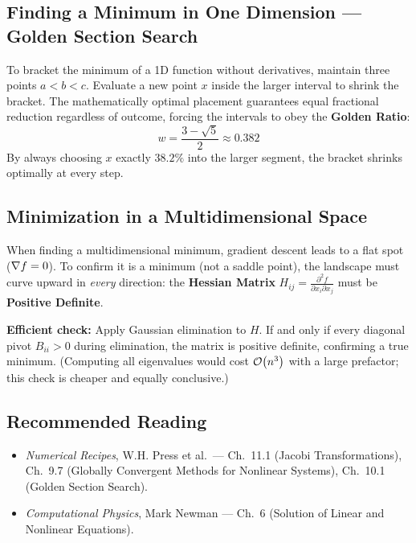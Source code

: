 \subsection{Finding a Minimum in One Dimension --- Golden Section Search}
To bracket the minimum of a 1D function without derivatives, maintain three
points $a < b < c$. Evaluate a new point $x$ inside the larger interval to
shrink the bracket. The mathematically optimal placement guarantees equal
fractional reduction regardless of outcome, forcing the intervals to obey
the \textbf{Golden Ratio}:
\begin{equation}
w = \frac{3 - \sqrt{5}}{2} \approx 0.382
\end{equation}
By always choosing $x$ exactly $38.2\%$ into the larger segment, the bracket
shrinks optimally at every step.

\subsection{Minimization in a Multidimensional Space}
When finding a multidimensional minimum, gradient descent leads to a flat
spot ($\nabla f = 0$). To confirm it is a minimum (not a saddle point), the
landscape must curve upward in \emph{every} direction: the \textbf{Hessian
Matrix} $H_{ij} = \frac{\partial^2 f}{\partial x_i \partial x_j}$ must be
\textbf{Positive Definite}.

\noindent\textbf{Efficient check:} Apply Gaussian elimination to $H$. If and
only if every diagonal pivot $B_{ii} > 0$ during elimination, the matrix is
positive definite, confirming a true minimum. (Computing all eigenvalues
would cost $\mathcal{O}\!\left(n^3\right)$ with a large prefactor; this check is cheaper and
equally conclusive.)

\subsection*{Recommended Reading}
\begin{itemize}
    \item \textit{Numerical Recipes}, W.H. Press et al.\ --- Ch.\ 11.1
    (Jacobi Transformations), Ch.\ 9.7 (Globally Convergent Methods for
    Nonlinear Systems), Ch.\ 10.1 (Golden Section Search).
    \item \textit{Computational Physics}, Mark Newman --- Ch.\ 6 (Solution of
    Linear and Nonlinear Equations).
\end{itemize}
